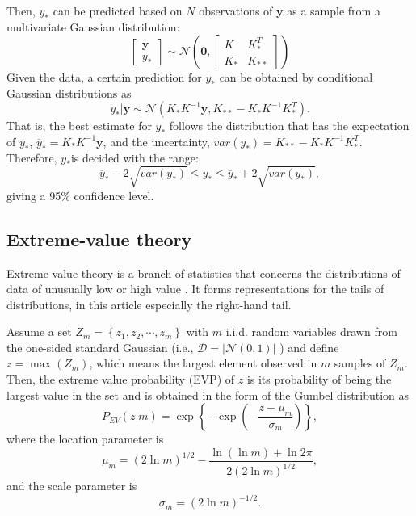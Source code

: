 \documentclass[final,authoryear,5p,times,twocolumn]{elsarticle}
\begin{document}
Then, $y_*$ can be predicted based on $N$ observations of $\mathbf{y}$ as a sample from a multivariate Gaussian distribution:
\[
\begin{bmatrix}
\mathbf{y}\\ 
y_*
\end{bmatrix}
\sim
\mathcal{N}
\left ( \mathbf{0},
\begin{bmatrix}
K & K_*^T\\ 
K_* & K_{**}
\end{bmatrix} \right )
\]
Given the data, a certain prediction for $y_*$ can be obtained by conditional Gaussian distributions as
\[
y_*|\mathbf{y}\sim \mathcal{N}(K_*K^{-1}\mathbf{y}, K_{**}-K_*K^{-1}K_*^T).
\]
That is, the best estimate for $y_*$ follows the distribution that has the expectation of $y_*$, $\overline{y}_*=K_*K^{-1}\mathbf{y}$, and the uncertainty, $var(y_*)=K_{**}-K_*K^{-1}K_*^T$. Therefore, $y_*$is decided with the range:
\[
\overline{y}_*-2\sqrt{var(y_*)} \leq y_* \leq \overline{y}_*+2\sqrt{var(y_*)},
\]
giving a 95\% confidence level.



\subsection{Extreme-value theory}
\label{section:Sec3.3}
Extreme-value theory is a branch of statistics that concerns the distributions of data of unusually low or high value \citep{ref23}. It forms representations for the tails of distributions, in this article especially the right-hand tail.

Assume a set $Z_m=\left \{ z_1,z_2,\cdots,z_m \right \}$ with $m$ i.i.d. random variables drawn from the one-sided standard Gaussian (i.e., $\mathcal{D}=\left | \mathcal{N}(0,1) \right |$ ) and define $z=\max(Z_m)$, which means the largest element observed in $m$ samples of $Z_m$. Then, the extreme value probability (EVP) of $z$ is its probability of  being the largest value in the set and is obtained in the form of the Gumbel distribution as \citep{ref23, ref24}
\begin{equation}
P_{EV}(z|m)=\exp\left \{ -\exp\left ( -\frac{z-\mu_m}{\sigma_m} \right ) \right \},
\end{equation}
where the location parameter is
\begin{equation}
\mu_m=(2\ln m)^{1/2}-\frac{\ln(\ln m)+\ln 2\pi}{2(2\ln m)^{1/2}},
\end{equation}
and the scale parameter is
\begin{equation}
\sigma_m=(2\ln m)^{-1/2}.
\end{equation}
\end{document}
